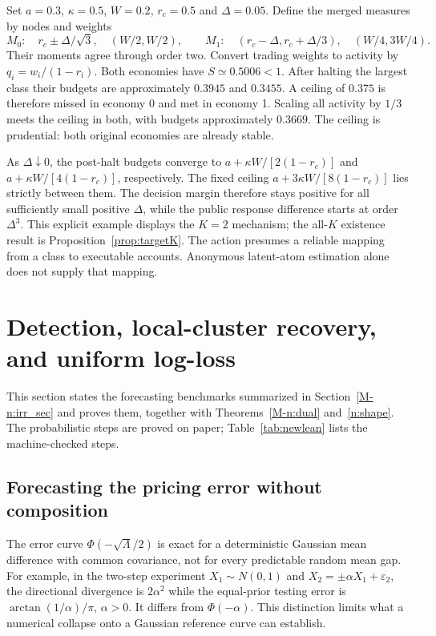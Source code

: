 \documentclass[12pt]{article}
\theoremstyle{definition}
\theoremstyle{remark}
\begin{document}
Set $a=0.3$, $\kappa=0.5$, $W=0.2$, $r_c=0.5$ and $\Delta=0.05$. Define the merged measures by nodes and weights
\[
M_0:\quad r_c\pm\Delta/\sqrt3,\quad (W/2,W/2),
\qquad
M_1:\quad (r_c-\Delta,r_c+\Delta/3),\quad(W/4,3W/4).
\]
Their moments agree through order two. Convert trading weights to activity by $q_i=w_i/(1-r_i)$. Both economies have $S\simeq0.5006<1$. After halting the largest class their budgets are approximately $0.3945$ and $0.3455$. A ceiling of $0.375$ is therefore missed in economy 0 and met in economy 1. Scaling all activity by $1/3$ meets the ceiling in both, with budgets approximately $0.3669$. The ceiling is prudential: both original economies are already stable.

As $\Delta\downarrow0$, the post-halt budgets converge to $a+\kappa W/[2(1-r_c)]$ and $a+\kappa W/[4(1-r_c)]$, respectively. The fixed ceiling $a+3\kappa W/[8(1-r_c)]$ lies strictly between them. The decision margin therefore stays positive for all sufficiently small positive $\Delta$, while the public response difference starts at order $\Delta^3$. This explicit example displays the $K=2$ mechanism; the all-$K$ existence result is Proposition~\ref{prop:targetK}. The action presumes a reliable mapping from a class to executable accounts. Anonymous latent-atom estimation alone does not supply that mapping.


\section{Detection, local-cluster recovery, and uniform log-loss}\label{app:incoming}

This section states the forecasting benchmarks summarized in Section~\ref{M-n:irr_sec} and proves them, together with Theorems~\ref{M-n:dual} and~\ref{n:shape}. The probabilistic steps are proved on paper; Table~\ref{tab:newlean} lists the machine-checked steps.

\subsection{Forecasting the pricing error without composition}\label{app:forecastbench}

The error curve $\Phi(-\sqrt{\Lambda}/2)$ is exact for a deterministic Gaussian mean difference with common covariance, not for every predictable random mean gap. For example, in the two-step experiment $X_1\sim N(0,1)$ and $X_2=\pm\alpha X_1+\varepsilon_2$, the directional divergence is $2\alpha^2$ while the equal-prior testing error is $\arctan(1/\alpha)/\pi$, $\alpha>0$. It differs from $\Phi(-\alpha)$. This distinction limits what a numerical collapse onto a Gaussian reference curve can establish.
\end{document}
